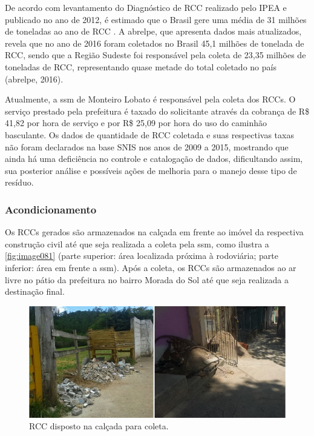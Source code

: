 	De acordo com levantamento do Diagnóstico de RCC realizado pelo IPEA e publicado no ano de 2012, é estimado que o Brasil gere uma média de 31 milhões de toneladas ao ano de RCC \cite{IPEA2012b}. A \gls{abrelpe}, que apresenta dados mais atualizados, revela que no ano de 2016 foram coletados no Brasil 45,1 milhões de tonelada de RCC, sendo que a Região Sudeste foi responsável pela coleta de 23,35 milhões de toneladas de RCC, representando quase metade do total coletado no país (\gls{abrelpe}, 2016).	
	
	Atualmente, a \gls{ssm} de Monteiro Lobato é responsável pela coleta dos RCCs. O serviço prestado pela prefeitura é taxado do solicitante através da cobrança de R\$ 41,82 por hora de serviço e por R\$ 25,09 por hora do uso do caminhão basculante. Os dados de quantidade de RCC coletada e suas respectivas taxas não foram declarados na base SNIS nos anos de 2009 a 2015, mostrando que ainda há uma deficiência no controle e catalogação de dados, dificultando assim, sua posterior análise e possíveis ações de melhoria para o manejo desse tipo de resíduo.
	
	\subsubsection{Acondicionamento}
	Os RCCs gerados são armazenados na calçada em frente ao imóvel da respectiva construção civil até que seja realizada a coleta pela \gls{ssm}, como ilustra a \autoref{fig:image081} (parte superior: área localizada próxima à rodoviária; parte inferior: área em frente a \gls{ssm}). Após a coleta, os RCCs são armazenados ao ar livre no pátio da prefeitura no bairro Morada do Sol até que seja realizada a destinação final.
	
	\begin{figure}
		\centering
		\includegraphics[width=0.75\linewidth]{produtos/prodtres/image081}
		\caption{RCC disposto na calçada para coleta.}
		\label{fig:image081}
	\end{figure}
	
